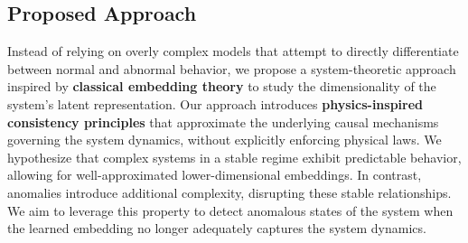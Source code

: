 \subsection{Proposed Approach}

Instead of relying on overly complex models that attempt to directly differentiate between normal and abnormal behavior, we propose a system-theoretic approach inspired by \textbf{classical embedding theory} to study the dimensionality of the system's latent representation. Our approach introduces \textbf{physics-inspired consistency principles} that approximate the underlying causal mechanisms governing the system dynamics, without explicitly enforcing physical laws. We hypothesize that complex systems in a stable regime exhibit predictable behavior, allowing for well-approximated lower-dimensional embeddings. In contrast, anomalies introduce additional complexity, disrupting these stable relationships. We aim to leverage this property to detect anomalous states of the system when the learned embedding no longer adequately captures the system dynamics.